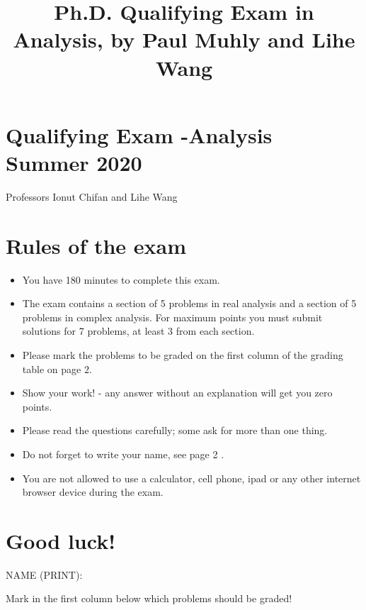 \documentclass[10pt]{article}
\title{Ph.D. Qualifying Exam in Analysis, by Paul Muhly and Lihe Wang }
\author{}
\date{}
\begin{document}
\maketitle
\section{Qualifying Exam -Analysis 
 Summer 2020}
Professors Ionut Chifan and Lihe Wang

\section{Rules of the exam}
\begin{itemize}
  \item You have 180 minutes to complete this exam.

  \item The exam contains a section of 5 problems in real analysis and a section of 5 problems in complex analysis. For maximum points you must submit solutions for 7 problems, at least 3 from each section.

  \item Please mark the problems to be graded on the first column of the grading table on page $2 .$

  \item Show your work! - any answer without an explanation will get you zero points.

  \item Please read the questions carefully; some ask for more than one thing.

  \item Do not forget to write your name, see page 2 .

  \item You are not allowed to use a calculator, cell phone, ipad or any other internet browser device during the exam.

\end{itemize}
\section{Good luck!}
NAME (PRINT):

Mark in the first column below which problems should be graded!
\end{document}
